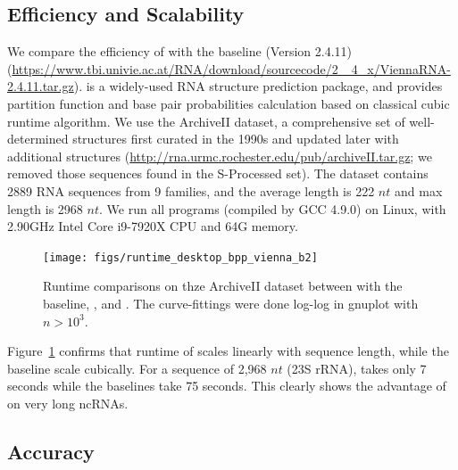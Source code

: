 

\subsection{Efficiency and Scalability}

We compare the efficiency of \linearpartition with the baseline \viennarnafold
(Version 2.4.11) (\url{https://www.tbi.univie.ac.at/RNA/download/sourcecode/2_ 4_x/ViennaRNA-2.4.11.tar.gz}).
\viennarnafold is a widely-used RNA structure prediction package,
and provides partition function and base pair probabilities calculation based on classical cubic runtime algorithm.
We use the ArchiveII dataset, %
a comprehensive set of well-determined structures first curated in the 1990s 
\cite{mathews+:1999}%
and updated later with additional structures 
\cite{sloma+mathews:2016}%
(\url{http://rna.urmc.rochester.edu/pub/archiveII.tar.gz}; 
we removed those sequences found in the S-Processed set).
The dataset contains 2889 RNA sequences from 9 families, 
and the average length is 222 $nt$ and max length is 2968 $nt$.
We run all programs (compiled by GCC 4.9.0) on Linux, 
with 2.90GHz Intel Core i9-7920X CPU and 64G memory.

\begin{figure}[H]
\center
\texttt{[image: figs/runtime\_desktop\_bpp\_vienna\_b2]}
\caption{Runtime comparisons on thze ArchiveII dataset between with the baseline, \viennarnafold, and \linearpartition. 
The curve-fittings were done log-log in gnuplot with $n > 10^3$.
\label{runtime}}
\end{figure}

Figure~\ref{runtime} confirms that runtime of \linearpartition scales linearly with sequence length, while the baseline \viennarnafold scale cubically. For a sequence of 2,968 $nt$ (23S rRNA), \linearpartition takes only 7 seconds while the baselines take 75 seconds. This clearly shows the advantage of \linearpartition on very long ncRNAs.


\subsection{Accuracy}

